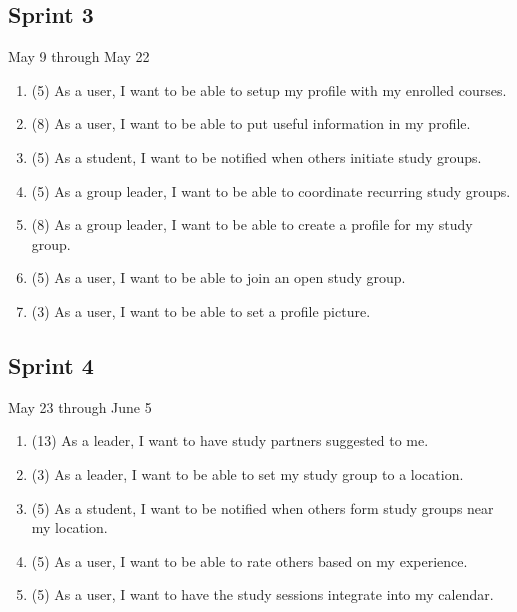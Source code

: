 \documentclass[10pt]{article}
\begin{document}
    \subsection{Sprint 3}
    May 9 through May 22
    \begin{enumerate}
        \item (5) As a user, I want to be able to setup my profile with my enrolled courses.
        \item (8) As a user, I want to be able to put useful information in my profile.
        \item (5) As a student, I want to be notified when others initiate study groups.
        \item (5) As a group leader, I want to be able to coordinate recurring study groups.
        \item (8) As a group leader, I want to be able to create a profile for my study group.
        \item (5) As a user, I want to be able to join an open study group.
        \item (3) As a user, I want to be able to set a profile picture.
    \end{enumerate}

    \subsection{Sprint 4}
    May 23 through June 5
    \begin{enumerate}
        \item (13) As a leader, I want to have study partners suggested to me.
        \item (3) As a leader, I want to be able to set my study group to a location.
        \item (5) As a student, I want to be notified when others form study groups near my location.
        \item (5) As a user, I want to be able to rate others based on my experience.
        \item (5) As a user, I want to have the study sessions integrate into my calendar.
    \end{enumerate}
\end{document}
